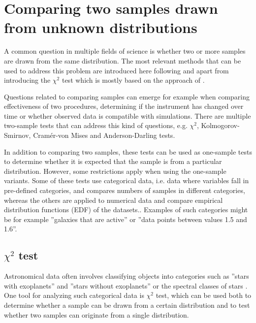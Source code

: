 \documentclass[english, oneside]{HYgradu}
\begin{document}
\section{Comparing two samples drawn from unknown distributions}
A common question in multiple fields of science is whether two or more samples are drawn from the same distribution. The most relevant methods that can be used to address this problem are introduced here following \citet{bohm2010introduction} and \citet{feigelson2012modern} apart from introducing the $\chi^2$ test which is mostly based on the approach of \citet{corder2014nonparametric}.

Questions related to comparing samples can emerge for example when comparing effectiveness of two procedures, determining if the instrument has changed over time or whether observed data is compatible with simulations. There are multiple two-sample tests that can address this kind of questions, e.g. $\chi^2$, Kolmogorov-Smirnov, Cram\'er-von Mises and Anderson-Darling tests. 

In addition to comparing two samples, these tests can be used as one-sample tests to determine whether it is expected that the sample is from a particular distribution. However, some restrictions apply when using the one-sample variants. Some of these tests use categorical data, i.e. data where variables fall in pre-defined categories, and compares numbers of samples in different categories, whereas the others are applied to numerical data and compare empirical distribution functions (EDF) of the datasets.. Examples of such categories might be for example ''galaxies that are active'' or ''data points between values 1.5 and 1.6''.


\subsection{$\chi^2$ test}
Astronomical data often involves classifying objects into categories such as ''stars with exoplanets'' and ''stars without exoplanets'' or the spectral classes of stars  \citep{feigelson2012modern}. One tool for analyzing such categorical data is $\chi^2$ test, which can be used both to determine whether a sample can be drawn from a certain distribution and to test whether two samples can originate from a single distribution. 
\end{document}
